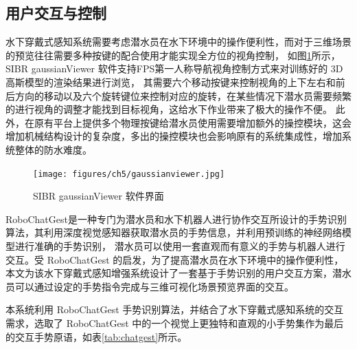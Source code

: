 \subsection{用户交互与控制}
水下穿戴式感知系统需要考虑潜水员在水下环境中的操作便利性，而对于三维场景的预览往往需要多种按键的配合使用才能实现全方位的视角控制，
如图\ref{img:gaussianviewer}所示，SIBR gaussianViewer 软件支持FPS第一人称导航视角控制方式来对训练好的 3D 高斯模型的渲染结果进行浏览，
其需要六个移动按键来控制视角的上下左右和前后方向的移动以及六个旋转键位来控制对应的旋转，在某些情况下潜水员需要频繁的进行视角的调整才能找到目标视角，这给水下作业带来了极大的操作不便。
此外，在原有平台上提供多个物理按键给潜水员使用需要增加额外的操控模块，这会增加机械结构设计的复杂度，多出的操控模块也会影响原有的系统集成性，增加系统整体的防水难度。
\begin{figure}[ht]
    \centering
    \texttt{[image: figures/ch5/gaussianviewer.jpg]}
    \caption{SIBR gaussianViewer 软件界面}
    \label{img:gaussianviewer}
\end{figure}

RoboChatGest\cite{robochatgest}是一种专门为潜水员和水下机器人进行协作交互所设计的手势识别算法，其利用深度视觉感知器获取潜水员的手势信息，并利用预训练的神经网络模型进行准确的手势识别，
潜水员可以使用一套直观而有意义的手势与机器人进行交互。受 RoboChatGest 的启发，为了提高潜水员在水下环境中的操作便利性，本文为该水下穿戴式感知增强系统设计了一套基于手势识别的用户交互方案，潜水员可以通过设定的手势指令完成与三维可视化场景预览界面的交互。

本系统利用 RoboChatGest 手势识别算法，并结合了水下穿戴式感知系统的交互需求，选取了 RoboChatGest 中的一个视觉上更独特和直观的小手势集作为最后的交互手势原语，如表\ref{tab:chatgest}所示。


